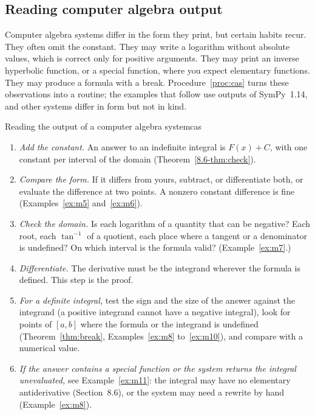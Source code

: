 \documentclass[11pt]{article}
\begin{document}
\subsection*{Reading computer algebra output}

Computer algebra systems differ in the form they print, but certain habits recur. They often omit the constant. They may write a logarithm without absolute values, which is correct only for positive arguments. They may print an inverse hyperbolic function, or a special function, where you expect elementary functions. They may produce a formula with a break. Procedure~\ref{proc:cas} turns these observations into a routine; the examples that follow use outputs of SymPy~1.14, and other systems differ in form but not in kind.

\begin{proc}{Reading the output of a computer algebra system}{cas}
\begin{enumerate}[nosep]
  \item \emph{Add the constant.} An answer to an indefinite integral is $F(x)+C$, with one constant per interval of the domain (Theorem~\ref{8.6-thm:check}).
  \item \emph{Compare the form.} If it differs from yours, subtract, or differentiate both, or evaluate the difference at two points. A nonzero constant difference is fine (Examples~\ref{ex:m5} and~\ref{ex:m6}).
  \item \emph{Check the domain.} Is each logarithm of a quantity that can be negative? Each root, each $\tan^{-1}$ of a quotient, each place where a tangent or a denominator is undefined? On which interval is the formula valid? (Example~\ref{ex:m7}.)
  \item \emph{Differentiate.} The derivative must be the integrand wherever the formula is defined. This step is the proof.
  \item \emph{For a definite integral,} test the sign and the size of the answer against the integrand (a positive integrand cannot have a negative integral), look for points of $[a,b]$ where the formula or the integrand is undefined (Theorem~\ref{thm:break}, Examples~\ref{ex:m8} to~\ref{ex:m10}), and compare with a numerical value.
  \item \emph{If the answer contains a special function or the system returns the integral unevaluated,} see Example~\ref{ex:m11}: the integral may have no elementary antiderivative (Section~8.6), or the system may need a rewrite by hand (Example~\ref{ex:m8}).
\end{enumerate}
\end{proc}
\end{document}
